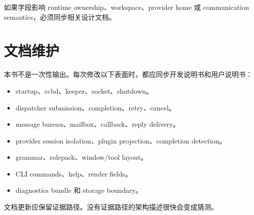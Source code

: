 如果字段影响 runtime ownership、workspace、provider home 或 communication semantics，必须同步相关设计文档。

\section{文档维护}

本书不是一次性输出。每次修改以下表面时，都应同步开发说明书和用户说明书：

\begin{itemize}
  \item startup、ccbd、keeper、socket、shutdown。
  \item dispatcher submission、completion、retry、cancel。
  \item message bureau、mailbox、callback、reply delivery。
  \item provider session isolation、plugin projection、completion detection。
  \item {} grammar、rolepack、window/tool layout。
  \item CLI commands、help、render fields。
  \item diagnostics bundle 和 storage boundary。
\end{itemize}

文档更新应保留证据路径。没有证据路径的架构描述很快会变成猜测。
